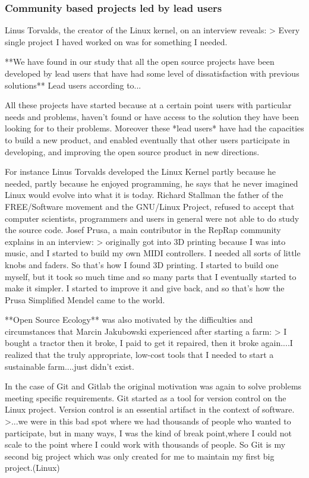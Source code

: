 \documentclass{ICED-Paper}%
\begin{document}
\subsubsection{Community based projects led by lead users}

Linus Torvalds, the creator of the Linux kernel, on an interview reveals:
> Every single project I haved worked on was for something I needed.

**We have found in our study that all the open source projects have been developed by lead users that have had some level of dissatisfaction with previous solutions** Lead users according to...

All these projects have started because at a certain point users with particular needs and problems, haven't found or have access to the solution they have been looking for to their problems. Moreover these *lead users* have had the capacities to build a new product, and enabled eventually that other users participate in developing, and improving the open source product in new directions.

For instance Linus Torvalds developed the Linux Kernel partly because he needed, partly because he enjoyed programming, he says that he never imagined Linux would evolve into what it is today. Richard Stallman the father of the FREE/Software movement and the GNU/Linux Project, refused to accept that computer scientists, programmers and users in general were not able to do study the source code.
Josef Prusa, a main contributor in the RepRap community explains in an interview:
>  originally got into 3D printing because I was into music, and I started to build my own MIDI controllers. I needed all sorts of little knobs and faders. So that’s how I found 3D printing. I started to build one myself, but it took so much time and so many parts that I eventually started to make it simpler. I started to improve it and give back, and so that’s how the Prusa Simplified Mendel came to the world.

**Open Source Ecology** was also motivated by the difficulties and circumstances that Marcin Jakubowski experienced after starting a farm:
> I bought a tractor then it broke, I paid to get it repaired, then it broke again....I realized that the truly appropriate, low-cost tools that I needed to start a sustainable farm....just didn't exist.

In the case of Git and Gitlab the original motivation was again to solve problems meeting specific requirements. Git started as a tool for version control on the Linux project. Version control is an essential artifact in the context of software.
>...we were in this bad spot where we had thousands of people
who wanted to participate, but in many ways, I was the kind of break point,where I could not scale to the point where I could work
with thousands of people. So Git is my second big project which was only created for me to maintain my first big project.(Linux)
\end{document}
